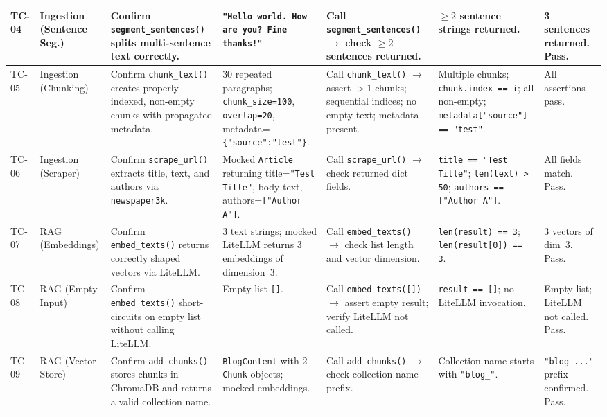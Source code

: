 \documentclass[sigconf,natbib=false]{acmart}   %
\begin{document}
{\begin{longtable}{|p{0.6cm}|p{1.4cm}|p{2.0cm}|p{2.3cm}|p{2.3cm}|p{2.3cm}|p{2.3cm}|}
TC-04 & Ingestion (Sentence Seg.) & Confirm \texttt{segment\_sentences()} splits multi-sentence text correctly. & \texttt{"Hello world. How are you? Fine thanks!"} & Call \texttt{segment\_sentences()} $\to$ check $\ge 2$ sentences returned. & $\ge 2$ sentence strings returned. & 3 sentences returned. Pass.\\
\hline

TC-05 & Ingestion (Chunking) & Confirm \texttt{chunk\_text()} creates properly indexed, non-empty chunks with propagated metadata. & 30 repeated paragraphs; \texttt{chunk\_size=100}, \texttt{overlap=20}, metadata=\texttt{\{"source":"test"\}}. & Call \texttt{chunk\_text()} $\to$ assert $>1$ chunks; sequential indices; no empty text; metadata present. & Multiple chunks; \texttt{chunk.index == i}; all non-empty; \texttt{metadata["source"] == "test"}. & All assertions pass.\\
\hline

TC-06 & Ingestion (Scraper) & Confirm \texttt{scrape\_url()} extracts title, text, and authors via \texttt{newspaper3k}. & Mocked \texttt{Article} returning title=\texttt{"Test Title"}, body text, authors=\texttt{["Author A"]}. & Call \texttt{scrape\_url()} $\to$ check returned dict fields. & \texttt{title == "Test Title"}; \texttt{len(text) > 50}; \texttt{authors == ["Author A"]}. & All fields match. Pass.\\
\hline

TC-07 & RAG (Embeddings) & Confirm \texttt{embed\_texts()} returns correctly shaped vectors via LiteLLM. & 3 text strings; mocked LiteLLM returns 3 embeddings of dimension~3. & Call \texttt{embed\_texts()} $\to$ check list length and vector dimension. & \texttt{len(result) == 3}; \texttt{len(result[0]) == 3}. & 3 vectors of dim~3. Pass.\\
\hline

TC-08 & RAG (Empty Input) & Confirm \texttt{embed\_texts()} short-circuits on empty list without calling LiteLLM. & Empty list \texttt{[]}. & Call \texttt{embed\_texts([])} $\to$ assert empty result; verify LiteLLM not called. & \texttt{result == []}; no LiteLLM invocation. & Empty list; LiteLLM not called. Pass.\\
\hline

TC-09 & RAG (Vector Store) & Confirm \texttt{add\_chunks()} stores chunks in ChromaDB and returns a valid collection name. & \texttt{BlogContent} with 2 \texttt{Chunk} objects; mocked embeddings. & Call \texttt{add\_chunks()} $\to$ check collection name prefix. & Collection name starts with \texttt{"blog\_"}. & \texttt{"blog\_..."} prefix confirmed. Pass.\\
\hline


\end{longtable}}
\end{document}
